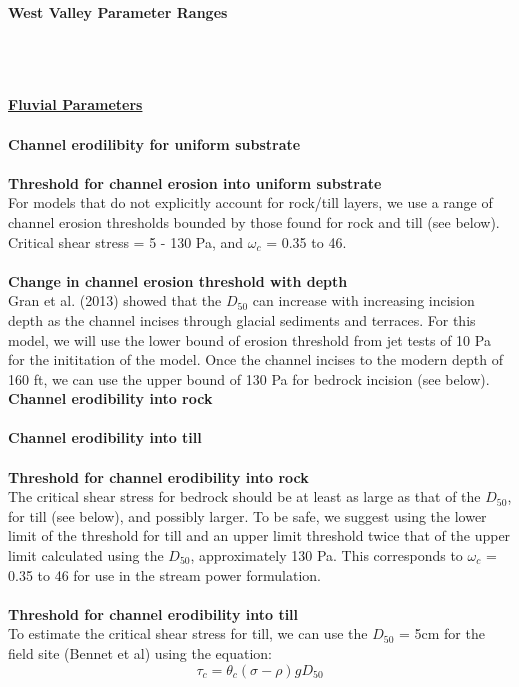 \documentclass[12pt]{article}
\begin{document}
\noindent 
\centerline{\textbf{\Huge{West Valley Parameter Ranges}}}
\\
\\
\\
\noindent
{\textbf{\Large{\underline{Fluvial Parameters}}}}
\\
\\
\noindent
{\textbf{Channel erodilibity for uniform substrate}}
\\
\\
\noindent
{\textbf{Threshold for channel erosion into uniform substrate}}
\\
For models that do not explicitly account for rock/till layers, we use a range of channel erosion thresholds bounded by those found for rock and till (see below). Critical shear stress = 5 - 130 Pa, and $\omega_c$ = 0.35 to 46. 
\\
\\
\noindent
{\textbf{Change in channel erosion threshold with depth}}
\\
Gran et al. (2013) showed that the $D_{50}$ can increase with increasing incision depth as the channel incises through glacial sediments and terraces. For this model, we will use the lower bound of erosion threshold from jet tests of 10 Pa for the inititation of the model. Once the channel incises to the modern depth of 160 ft, we can use the upper bound of 130 Pa for bedrock incision (see below).
\\
\noindent
{\textbf{Channel erodibility into rock}}
\\
\\
\noindent
{\textbf{Channel erodibility into till}}
\\
\\
\noindent
{\textbf{Threshold for channel erodibility into rock}}
\\
The critical shear stress for bedrock should be at least as large as that of the $D_{50}$, for till (see below), and possibly larger. To be safe, we suggest using the lower limit of the threshold for till and an upper limit threshold twice that of the upper limit calculated using the $D_{50}$, approximately 130 Pa. This corresponds to $\omega_c$ = 0.35 to 46 for use in the stream power formulation. 
\\
\\
\noindent
{\textbf{Threshold for channel erodibility into till}}
\\
To estimate the critical shear stress for till, we can use the $D_{50}$ = 5cm for the field site (Bennet et al) using the equation:
\begin{equation}
\tau_c = \theta_c (\sigma - \rho ) g D_{50}
\end{equation}
\end{document}
